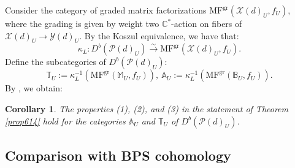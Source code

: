 \documentclass [11pt,oneside,a4paper,mathscr]{amsart}
\newtheorem{cor}[thm]{Corollary}
\theoremstyle{definition}
\newcommand{\X}{\mathscr{X}}
\begin{document}
Consider the category of graded matrix factorizations $\mathrm{MF}^{\mathrm{gr}}(\mathscr{X}(d)_U, f_U)$, where the grading is given by weight two $\mathbb{C}^{\ast}$-action on
fibers of $\X(d)_U \to \mathscr{Y}(d)_U$. 
By the Koszul equivalence, we have that:
\begin{equation}\label{koszuletale}
\kappa_L\colon D^b(\mathscr{P}(d)_U)\xrightarrow{\sim}\mathrm{MF}^{\mathrm{gr}}(\mathscr{X}(d)_U, f_U).
\end{equation}
Define the subcategories of $D^b(\mathscr{P}(d)_U)$:
\[\mathbb{T}_U:=\kappa_L^{-1}\left(\mathrm{MF}^{\mathrm{gr}}(\mathbb{M}_U, f_U)\right), \ \mathbb{A}_U:=\kappa_L^{-1}\left(\mathrm{MF}^{\mathrm{gr}}(\mathbb{B}_U, f_U)\right).\]
By \cite[Proposition 2.5]{PTzero}, we obtain:

\begin{cor}\label{prop6155}
The properties (1), (2), and (3) in the statement of Theorem \ref{prop614} hold for the categories $\mathbb{A}_U$ and $\mathbb{T}_U$ of $D^b(\mathscr{P}(d)_U)$.
\end{cor}




\subsection{Comparison with BPS cohomology}\label{subsec672}
\end{document}
